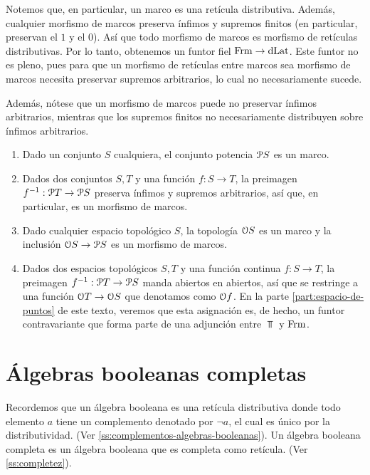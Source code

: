 Notemos que, en particular, un marco es una retícula distributiva.
Además, cualquier morfismo de marcos preserva ínfimos y supremos
finitos (en particular, preservan el $1$ y el $0$). Así que todo
morfismo de marcos es morfismo de retículas distributivas. Por lo
tanto, obtenemos un funtor fiel $\Frm\to\DLat$. Este funtor no es
pleno, pues para que un morfismo de retículas entre marcos sea
morfismo de marcos necesita preservar supremos arbitrarios, lo cual no
necesariamente sucede.

Además, nótese que un morfismo de marcos puede no preservar ínfimos
arbitrarios, mientras que los supremos finitos no necesariamente
distribuyen sobre ínfimos arbitrarios.

\begin{example}
  \begin{enumerate}
    \item Dado un conjunto $S$ cualquiera, el conjunto potencia
    $\cal PS$ es un marco.
    \item Dados dos conjuntos $S,T$ y una función $f:S\to T$,
    la preimagen $f^{-1}:\cal PT\to\cal PS$ preserva ínfimos
    y supremos arbitrarios, así que, en particular, es un
    morfismo de marcos.
    \item Dado cualquier espacio topológico $S$, la topología
    $\cal OS$ es un marco y la inclusión $\cal OS\to\cal PS$
    es un morfismo de marcos.
    \item Dados dos espacios topológicos $S,T$ y una función
    continua $f:S\to T$, la preimagen $f^{-1}:\cal PT\to\cal
    PS$ manda abiertos en abiertos, así que se restringe a
    una función $\cal OT\to\cal OS$ que denotamos como $\cal
    Of$.
    En la parte \ref{part:espacio-de-puntos} de este texto,
    veremos que esta asignación es, de hecho, un funtor
    contravariante que forma parte de una
    adjunción entre $\Top$ y $\Frm$.
  \end{enumerate}
\end{example}

\section{Álgebras booleanas completas}\label{ABC}
Recordemos que un álgebra booleana es una retícula distributiva
donde todo elemento $a$ tiene un complemento denotado por $\neg a$, 
el cual es único por la distributividad. (Ver \ref{ss:complementos-algebras-booleanas}).
Un álgebra booleana completa es un álgebra booleana que es
completa como retícula. (Ver \ref{ss:completez}).

